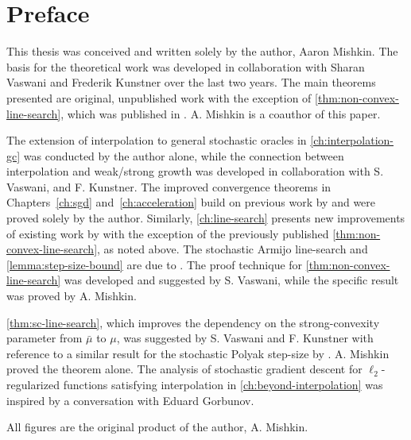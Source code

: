 
\chapter{Preface}

This thesis was conceived and written solely by the author, Aaron Mishkin. 
The basis for the theoretical work was developed in collaboration with Sharan Vaswani and Frederik Kunstner over the last two years.
The main theorems presented are original, unpublished work with the exception of \autoref{thm:non-convex-line-search}, which was published in \citet{vaswani2019painless}. A. Mishkin is a coauthor of this paper.

The extension of interpolation to general stochastic oracles in \autoref{ch:interpolation-gc} was conducted by the author alone, while the connection between interpolation and weak/strong growth was developed in collaboration with S. Vaswani, and F. Kunstner. 
The improved convergence theorems in Chapters~\ref{ch:sgd} and~\ref{ch:acceleration} build on previous work by \citet{vaswani2019fast} and were proved solely by the author.  
Similarly, \autoref{ch:line-search} presents new improvements of existing work by \citet{vaswani2019painless} with the exception of the previously published \autoref{thm:non-convex-line-search}, as noted above.
The stochastic Armijo line-search and \autoref{lemma:step-size-bound} are due to \citet{vaswani2019painless}. 
The proof technique for \autoref{thm:non-convex-line-search} was developed and suggested by S. Vaswani, while the specific result was proved by A. Mishkin. 

\autoref{thm:sc-line-search}, which improves the dependency on the strong-convexity parameter from \( \bar \mu \) to \( \mu \), was suggested by S. Vaswani and F. Kunstner with reference to a similar result for the stochastic Polyak step-size by \citet{loizou2020sps}. 
A. Mishkin proved the theorem alone. 
The analysis of stochastic gradient descent for \( \ell_2 \)-regularized functions satisfying interpolation in \autoref{ch:beyond-interpolation} was inspired by a conversation with Eduard Gorbunov.

All figures are the original product of the author, A. Mishkin.
